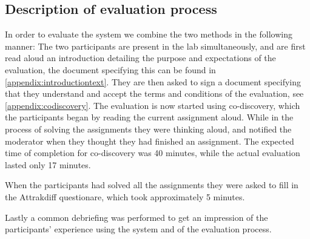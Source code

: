 \subsection{Description of evaluation process}
In order to evaluate the system we combine the two methods in the following manner: The two participants are present in the lab simultaneously, and are first read aloud an introduction detailing the purpose and expectations of the evaluation, the document specifying this can be found in \autoref{appendix:introductiontext}. They are then asked to sign a document specifying that they understand and accept the terms and conditions of the evaluation, see \autoref{appendix:codiscovery}.
The evaluation is now started using co-discovery, which the participants began by reading the current assignment aloud. While in the process of solving the assignments they were thinking aloud, and notified the moderator when they thought they had finished an assignment. The expected time of completion for co-discovery was 40 minutes, while the actual evaluation lasted only 17 minutes.

When the participants had solved all the assignments they were asked to fill in the Attrakdiff questionare, which took approximately 5 minutes.

Lastly a common debriefing was performed to get an impression of the participants' experience using the system and of the evaluation process.
